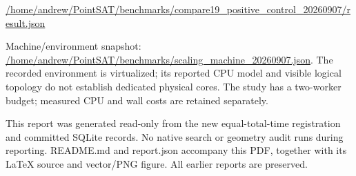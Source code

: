 \documentclass[10pt,a4paper]{article}
\begin{document}
{\small\url{/home/andrew/PointSAT/benchmarks/compare19_positive_control_20260907/result.json}}

Machine/environment snapshot: {\small\url{/home/andrew/PointSAT/benchmarks/scaling_machine_20260907.json}}. The recorded environment is virtualized; its reported CPU model and visible logical topology do not establish dedicated physical cores. The study has a two-worker budget; measured CPU and wall costs are retained separately.

This report was generated read-only from the new equal-total-time registration and committed SQLite records. No native search or geometry audit runs during reporting. README.md and report.json accompany this PDF, together with its LaTeX source and vector/PNG figure. All earlier reports are preserved.
\end{document}
